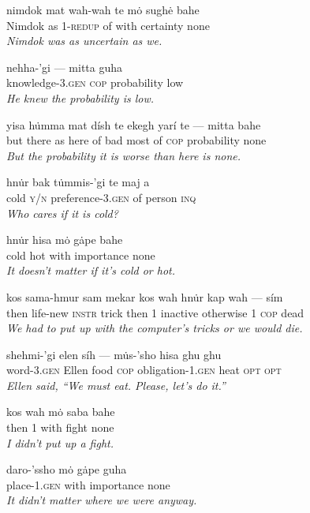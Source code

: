 \documentclass{article}[10pt]
\begin{document}
\begin{exe}

\ex
\gll nimdok mat wah-wah te m\.{o} sugh\.{e} bahe\\
Nimdok as 1-\textsc{redup} of with certainty none\\
\trans \emph{Nimdok was as uncertain as we.}

\ex 
\gll nehha-'gi --- mitta guha\\
knowledge-3.\textsc{gen} \textsc{cop} probability low\\
\trans \emph{He knew the probability is low.}

\ex
\gll yisa h\.{u}mma mat d\'{i}sh te ekegh yar\'{i} te --- mitta bahe\\
but there as here of bad most of \textsc{cop} probability none\\
\trans \emph{But the probability it is worse than here is none.}

\ex
\gll hn\.{u}r bak t\.{u}mmis-'gi te maj a\\
cold \textsc{y/n} preference-3.\textsc{gen} of person \textsc{inq}\\
\trans \emph{Who cares if it is cold?}

\ex
\gll hn\.{u}r hisa m\.{o} g\.{a}pe bahe\\
cold hot with importance none\\
\trans \emph{It doesn't matter if it's cold or hot.}

\ex
\gll kos sama-hmur sam mekar kos wah hn\.{u}r kap wah --- s\'{i}m\\
then life-new \textsc{instr} trick then 1 inactive otherwise 1 \textsc{cop} dead\\
\trans \emph{We had to put up with the computer's tricks or we would die.}


\ex
\gll shehmi-'gi elen s\'{i}h --- m\.{u}s-'sho hisa ghu ghu\\
word-3.\textsc{gen} Ellen food \textsc{cop} obligation-1.\textsc{gen} heat \textsc{opt} \textsc{opt}\\
\trans \emph{Ellen said, ``We must eat. Please, let's do it.''}


\ex
\gll kos wah m\.{o} saba bahe\\
then 1 with fight none\\
\trans \emph{I didn't put up a fight.}

\ex
\gll daro-'ssho m\.{o} g\.{a}pe guha\\
place-1.\textsc{gen} with importance none\\
\trans \emph{It didn't matter where we were anyway.}


\end{exe}
\end{document}
